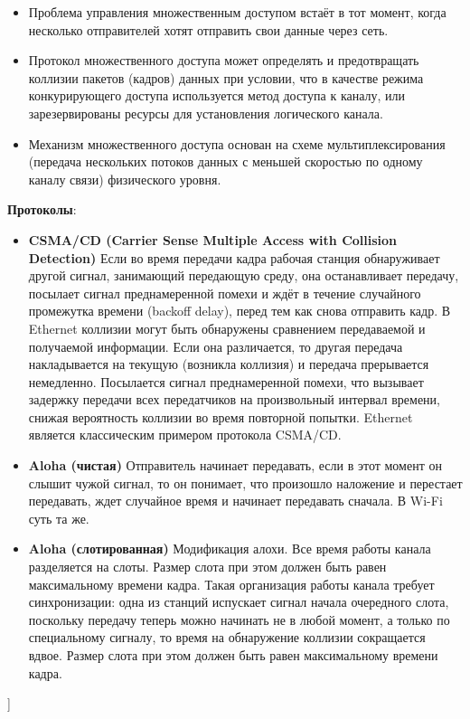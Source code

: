 \begin{itemize}
    \item Проблема управления множественным доступом встаёт в тот момент, когда несколько отправителей хотят отправить свои данные через сеть.
    \item Протокол множественного доступа может определять и предотвращать коллизии пакетов (кадров) данных при условии, что в качестве режима конкурирующего доступа используется метод доступа к каналу, или зарезервированы ресурсы для установления логического канала.
    \item Механизм множественного доступа основан на схеме мультиплексирования (передача нескольких потоков данных с меньшей скоростью по одному каналу связи) физического уровня.
\end{itemize}
\textbf{Протоколы}:
\begin{itemize}
    \item \textbf{CSMA/CD (Carrier Sense Multiple Access with Collision Detection)}
    Если во время передачи кадра рабочая станция обнаруживает другой сигнал, занимающий передающую среду, она останавливает передачу, посылает сигнал преднамеренной помехи и ждёт в течение случайного промежутка времени (backoff delay), перед тем как снова отправить кадр.
    В Ethernet коллизии могут быть обнаружены сравнением передаваемой и получаемой информации. Если она различается, то другая передача накладывается на текущую (возникла коллизия) и передача прерывается немедленно. Посылается сигнал преднамеренной помехи, что вызывает задержку передачи всех передатчиков на произвольный интервал времени, снижая вероятность коллизии во время повторной попытки.
    Ethernet является классическим примером протокола CSMA/CD.
    \item \textbf{Aloha (чистая)}
    Отправитель начинает передавать, если в этот момент он слышит чужой сигнал, то он понимает, что произошло наложение и перестает передавать, ждет случайное время и начинает передавать сначала.
    В Wi-Fi суть та же.
    \item \textbf{Aloha (слотированная)}
    Модификация алохи. Все время работы канала разделяется на слоты. Размер слота при этом должен быть равен максимальному времени кадра. Такая организация работы канала требует синхронизации: одна из станций испускает сигнал начала очередного слота, поскольку передачу теперь можно начинать не в любой момент, а только по специальному сигналу, то время на обнаружение коллизии сокращается вдвое. Размер слота при этом должен быть равен максимальному времени кадра.
\end{itemize}

\bigbreak
[\cite[page 69-96]{smelbook2}]
